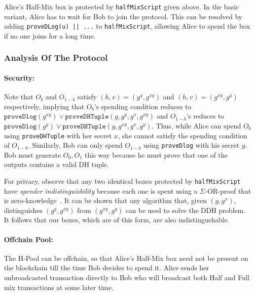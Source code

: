 \documentclass[11pt]{article}
\begin{document}
Alice's Half-Mix box is protected by \texttt{halfMixScript} given above. In the basic variant, Alice has to wait for Bob to join the protocol. This can be resolved by adding  \texttt{proveDLog(u) || ...} to \texttt{halfMixScript}, allowing Alice to spend the box if no one joins for a long time.  

\subsubsection{Analysis Of The Protocol}
\paragraph{Security:} Note that $O_b$ and $O_{1-b}$ satisfy $(h, v) = (g^y, g^{xy})$ and $(h, v) = (g^{xy}, g^y)$ respectively, implying that $O_b$'s  spending condition reduces to $\texttt{proveDlog}(g^{xy}) \lor \texttt{proveDHTuple}(g, g^y, g^x, g^{xy})$ and $O_{1-b}$'s reduces to $\texttt{proveDlog}(g^y) \lor \texttt{proveDHTuple}(g, g^{xy}, g^x, g^y)$. Thus, while Alice can spend $O_b$ using \texttt{proveDHTuple} with her secret $x$, she cannot satisfy the spending condition of $O_{1-b}$. Similarly, Bob can only spend $O_{1-b}$ using \texttt{proveDlog} with his secret $y$. Bob must generate $O_0, O_1$ this way because he must prove that one of the outputs contains a valid DH tuple.

For privacy, observe that any two identical boxes protected by \texttt{halfMixScript} have {\em spender indistinguisbility} because each one is spent using a $\Sigma$-OR-proof that is zero-knowledge~\cite{Dam10}. It can be shown that any algorithm that, given $(g, g^x)$, distinguishes $(g^y, g^{xy})$ from $(g^{xy}, g^y)$ can be used to solve the DDH problem. It follows that our boxes, which are of this form, are also indistingushable.

\paragraph{Offchain Pool:} The H-Pool can be offchain, so that Alice's Half-Mix box need not be present on the blockchain till the time Bob decides to spend it. Alice sends her unbroadcasted transaction directly to Bob who will broadcast both Half and Full mix transactions at some later time. 

\end{document}
